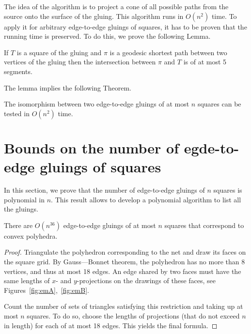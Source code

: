 \documentclass[a4paper,USenglish,cleveref, autoref, thm-restate]{socg-lipics-v2019}
\begin{document}
The idea of the algorithm is to project a cone of all possible paths from the source onto the surface of the gluing. This algorithm runs in $O(n^2)$ time. To apply it for arbitrary edge-to-edge gluings of squares, it has to be proven that the running time is preserved. To do this, we prove the following Lemma.

\begin{lemma} \label{lm:shortestSquare}
	If $T$ is a square of the gluing and $\pi$ is a geodesic shortest path between two vertices of the gluing then the intersection between $\pi$ and $T$ is of at most 5 segments.
\end{lemma}

The lemma implies the following Theorem.

\begin{theorem} \label{thm:chruntime}
	The isomorphism between two edge-to-edge gluings of at most $n$ squares can be tested in $O(n^2)$ time.
\end{theorem}

\section{Bounds on the number of egde-to-edge gluings of squares}

In this section, we prove that the number of edge-to-edge gluings of $n$ squares is polynomial in $n$. This result allows to develop a polynomial algorithm to list all the gluings.

\begin{theorem} \label{thm:n36}
	There are $O \left( n^{36} \right)$ edge-to-edge gluings of at most $n$ squares that correspond to convex polyhedra.
\end{theorem}

\begin{proof}
	Triangulate the polyhedron corresponding to the net and draw its faces on the square grid. By Gauss—Bonnet theorem, the polyhedron has no more than 8 vertices, and thus at most 18 edges. An edge shared by two faces must have the same lengths of $x$- and $y$-projections on the drawings of these faces, see Figures~\ref{fig:emA},~\ref{fig:emB}.

	Count the number of sets of triangles satisfying this restriction and taking up at most $n$ squares. To do so, choose the lengths of projections (that do not exceed $n$ in length) for each of at most 18 edges. This yields the final formula.
\end{proof}
\end{document}
